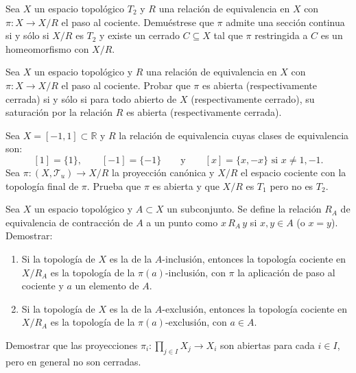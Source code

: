 \begin{ejer}[104]
Sea $X$ un espacio topológico $T_2$ y $R$ una relación de equivalencia en $X$ con $\pi \colon X \to X/R$ el paso al cociente. Demuéstrese que $\pi$ admite una sección continua si y sólo si $X/R$ es $T_2$ y existe un cerrado $C \subseteq X$ tal que $\pi$ restringida a $C$ es un homeomorfismo con $X/R$.
\end{ejer}

\begin{ejer}[105]
Sea $X$ un espacio topológico y $R$ una relación de equivalencia en $X$ con $\pi \colon X \to X/R$ el paso al cociente. Probar que $\pi$ es abierta (respectivamente cerrada) si y sólo si para todo abierto de $X$ (respectivamente cerrado), su saturación por la relación $R$ es abierta (respectivamente cerrada).
\end{ejer}

\begin{ejer}[106]
Sea $X = [-1,1] \subset \mathbb{R}$ y $R$ la relación de equivalencia cuyas clases de equivalencia son:
\[
    [1] = \{1\}, \qquad [-1] = \{-1\} \qquad \text{y} \qquad [x] = \{x, -x\} \text{ si } x \neq 1, -1.
\]
Sea $\pi \colon (X, \mathcal{T}_u) \to X/R$ la proyección canónica y $X/R$ el espacio cociente con la topología final de $\pi$. Prueba que $\pi$ es abierta y que $X/R$ es $T_1$ pero no es $T_2$.
\end{ejer}

\begin{ejer}[107]
Sea $X$ un espacio topológico y $A \subset X$ un subconjunto. Se define la relación $R_A$ de equivalencia de contracción de $A$ a un punto como $x \, R_A \, y$ si $x, y \in A$ (o $x = y$). Demostrar:
\begin{enumerate}
    \item[a)] Si la topología de $X$ es la de la $A$-inclusión, entonces la topología cociente en $X/R_A$ es la topología de la $\pi(a)$-inclusión, con $\pi$ la aplicación de paso al cociente y $a$ un elemento de $A$.
    \item[b)] Si la topología de $X$ es la de la $A$-exclusión, entonces la topología cociente en $X/R_A$ es la topología de la $\pi(a)$-exclusión, con $a \in A$.
\end{enumerate}
\end{ejer}

\begin{ejer}[108]
Demostrar que las proyecciones $\pi_i \colon \prod_{j \in I} X_j \to X_i$ son abiertas para cada $i \in I$, pero en general no son cerradas.
\end{ejer}

